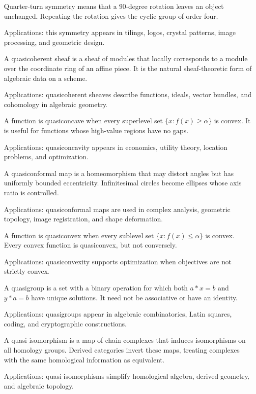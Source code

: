 Quarter-turn symmetry means that a $90$-degree rotation leaves an object unchanged. Repeating the rotation gives the cyclic group of order four. \par\noindent Applications: this symmetry appears in tilings, logos, crystal patterns, image processing, and geometric design.

A quasicoherent sheaf is a sheaf of modules that locally corresponds to a module over the coordinate ring of an affine piece. It is the natural sheaf-theoretic form of algebraic data on a scheme. \par\noindent Applications: quasicoherent sheaves describe functions, ideals, vector bundles, and cohomology in algebraic geometry.

A function is quasiconcave when every superlevel set $\{x:f(x)\geq\alpha\}$ is convex. It is useful for functions whose high-value regions have no gaps. \par\noindent Applications: quasiconcavity appears in economics, utility theory, location problems, and optimization.

A quasiconformal map is a homeomorphism that may distort angles but has uniformly bounded eccentricity. Infinitesimal circles become ellipses whose axis ratio is controlled. \par\noindent Applications: quasiconformal maps are used in complex analysis, geometric topology, image registration, and shape deformation.

A function is quasiconvex when every sublevel set $\{x:f(x)\leq\alpha\}$ is convex. Every convex function is quasiconvex, but not conversely. \par\noindent Applications: quasiconvexity supports optimization when objectives are not strictly convex.

A quasigroup is a set with a binary operation for which both $a*x=b$ and $y*a=b$ have unique solutions. It need not be associative or have an identity. \par\noindent Applications: quasigroups appear in algebraic combinatorics, Latin squares, coding, and cryptographic constructions.

A quasi-isomorphism is a map of chain complexes that induces isomorphisms on all homology groups. Derived categories invert these maps, treating complexes with the same homological information as equivalent. \par\noindent Applications: quasi-isomorphisms simplify homological algebra, derived geometry, and algebraic topology.

